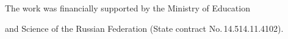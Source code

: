 














\Ack


\noindent


The work was financially supported by the Ministry of Education


and Science of the Russian Federation (State contract No.\,14.514.11.4102).








\vspace*{-2pt}











\renewcommand{\bibname}{\protect\rmfamily References}







